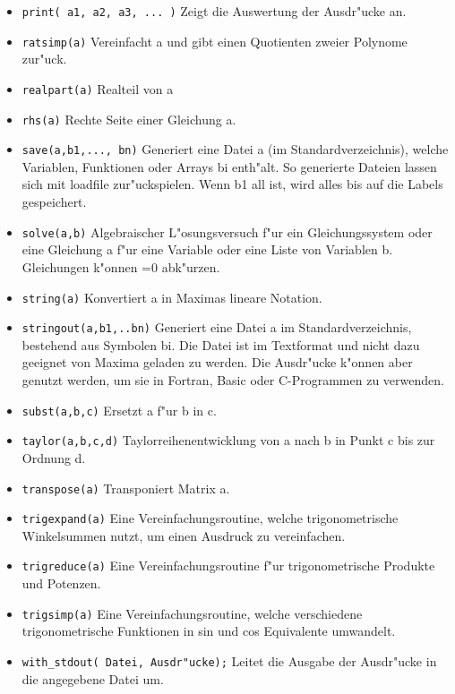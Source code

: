 \documentclass[spanish,12pt,a4paper]{article}
\begin{document}
\begin{itemize}
\item \verb|print( a1, a2, a3, ... )| Zeigt die Auswertung der Ausdr"ucke an.
\item \verb|ratsimp(a)| Vereinfacht a und gibt einen Quotienten zweier Polynome zur"uck.
\item \verb|realpart(a)| Realteil von a
\item \verb|rhs(a)| Rechte Seite einer Gleichung a.
\item \verb|save(a,b1,..., bn)| Generiert eine Datei a (im Standardverzeichnis), welche Variablen, Funktionen oder Arrays bi enth"alt. So generierte Dateien lassen sich mit loadfile zur"uckspielen. Wenn b1 all ist, wird alles bis auf die Labels gespeichert.
\item \verb|solve(a,b)| Algebraischer L"osungsversuch f"ur ein Gleichungssystem oder eine Gleichung a f"ur eine Variable oder eine Liste von Variablen b. Gleichungen k"onnen =0 abk"urzen.
\item \verb|string(a)| Konvertiert a in Maximas lineare Notation.
\item \verb|stringout(a,b1,..bn)| Generiert eine Datei a im Standardverzeichnis, bestehend aus Symbolen bi. Die Datei ist im Textformat und nicht dazu geeignet von Maxima geladen zu werden. Die Ausdr"ucke k"onnen aber genutzt werden, um sie in Fortran, Basic oder C-Programmen zu verwenden.
\item \verb|subst(a,b,c)| Ersetzt a f"ur b in c.
\item \verb|taylor(a,b,c,d)| Taylorreihenentwicklung von a nach b in Punkt c bis zur Ordnung d.
\item \verb|transpose(a)| Transponiert Matrix a.
\item \verb|trigexpand(a)| Eine Vereinfachungsroutine, welche trigonometrische Winkelsummen nutzt, um einen Ausdruck zu vereinfachen.
\item \verb|trigreduce(a)| Eine Vereinfachungsroutine f"ur trigonometrische Produkte und Potenzen.
\item \verb|trigsimp(a)| Eine Vereinfachungsroutine, welche verschiedene trigonometrische Funktionen in sin und cos Equivalente umwandelt.
\item \verb|with_stdout( Datei, Ausdr"ucke);| Leitet die Ausgabe der Ausdr"ucke in die angegebene Datei um.
\end{itemize}
\end{document}
